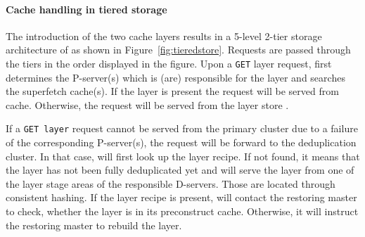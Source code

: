 \paragraph{Cache handling in tiered storage} %
The introduction of the two cache layers results in a 5-level 2-tier storage architecture of
\sysname as shown in Figure~\ref{fig:tieredstore}.
 Requests are passed through the
tiers in the order displayed in the figure. Upon a \texttt{GET} layer request,
\sysname first determines the P-server(s) which is (are) responsible for the layer
and searches the superfetch cache(s).
If the layer is present the request will be served from cache.
Otherwise, the request will be served from the layer store .

If a \texttt{GET layer} request cannot be served from the primary cluster
due to a failure of the corresponding P-server(s),
the request will be forward to the deduplication cluster.
In that case, \sysname will first look up the layer recipe. If not found, it means that
the layer has not been fully deduplicated yet and \sysname will serve the layer
from one of the layer stage areas of the responsible D-servers. Those are located
through consistent hashing.
If the layer recipe is present, \sysname will contact the restoring master to
check, whether the layer is in its preconstruct cache. Otherwise, it will
instruct the restoring master to rebuild the layer.

